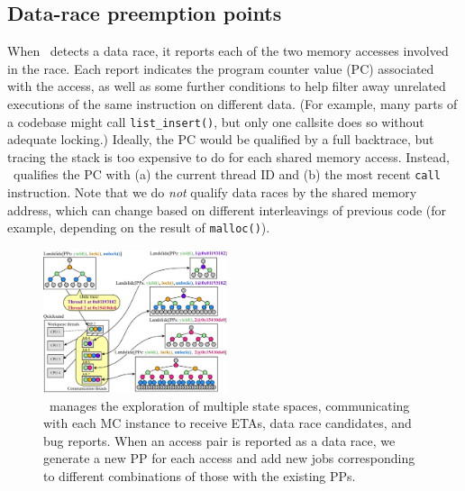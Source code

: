 
\subsection{Data-race preemption points}

When \landslide~detects a data race, it reports each of the two memory accesses involved in the race.
Each report indicates the program counter value (PC) associated with the access, as well as some further conditions to help filter away unrelated executions of the same instruction on different data.
(For example, many parts of a codebase might call {\tt list\_insert()}, but only one callsite does so without adequate locking.)
Ideally, the PC would be qualified by a full backtrace, but tracing the stack is too expensive to do for each shared memory access.
Instead, \landslide~qualifies the PC with
(a) the current thread ID and
(b) the most recent {\tt call} instruction.
Note that we do {\em not} qualify data races by the shared memory address,
which can change based on different interleavings of previous code
(for example, depending on the result of {\tt malloc()}).

\begin{figure}[t]
	\includegraphics[width=0.48\textwidth]{dr-jobs.pdf}
	\caption{\quicksand~manages the exploration of multiple state spaces, communicating with each MC instance to receive ETAs, data race candidates, and bug reports.
		When an access pair is reported as a data race, we generate a new PP for each access and add new jobs corresponding to different combinations of those with the existing PPs.}
	\label{fig:new-dr-jobs}
\end{figure}


